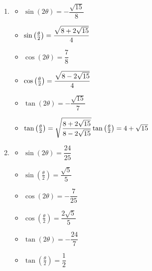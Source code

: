 \begin{enumerate}
\begin{multicols}{3}
\begin{itemize}
\end{itemize}

\end{multicols}

\item \begin{multicols}{3}

\begin{itemize}

\item $\sin(2\theta) = -\dfrac{\sqrt{15}}{8}$
\item $\sin\left(\frac{\theta}{2}\right) =\dfrac{\sqrt{8+2\sqrt{15}}}{4} \\ \phantom{\tan\left(\frac{\theta}{2}\right) = 4+\sqrt{15}}$ 
\item $\cos(2\theta) = \dfrac{7}{8}$
\item $\cos\left(\frac{\theta}{2}\right) = \dfrac{\sqrt{8-2\sqrt{15}}}{4} \\ \phantom{\tan\left(\frac{\theta}{2}\right) = 4+\sqrt{15}} $
\item $\tan(2\theta) = -\dfrac{\sqrt{15}}{7}$
\item $\tan\left(\frac{\theta}{2}\right) = \sqrt{\dfrac{8+2\sqrt{15}}{8-2\sqrt{15}}} \\ \tan\left(\frac{\theta}{2}\right) = 4+\sqrt{15}$

\end{itemize}

\end{multicols}

\item \begin{multicols}{3}

\begin{itemize}

\item $\sin(2\theta) = \dfrac{24}{25}$
\item $\sin\left(\frac{\theta}{2}\right) = \dfrac{\sqrt{5}}{5}$
\item $\cos(2\theta) = -\dfrac{7}{25}$
\item $\cos\left(\frac{\theta}{2}\right) = \dfrac{2\sqrt{5}}{5}$
\item $\tan(2\theta)=-\dfrac{24}{7} $
\item $\tan\left(\frac{\theta}{2}\right) = \dfrac{1}{2}$

\end{itemize}

\end{multicols}

\pagebreak


\end{enumerate}

